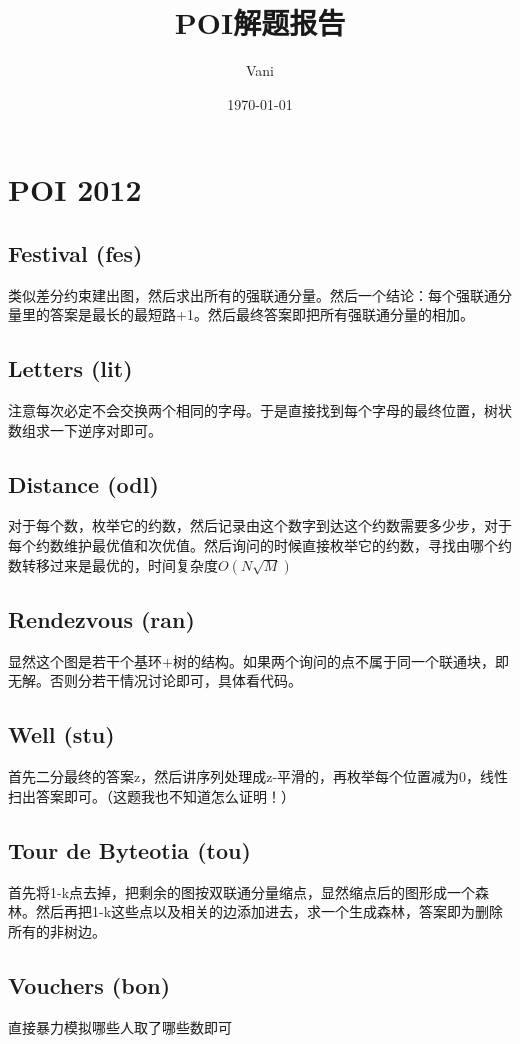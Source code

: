 \documentclass[a4paper,11pt]{article}
\title{POI解题报告}
\author{Vani}
\date{\today}
\begin{document}
\maketitle

\section{POI 2012}

\subsection*{Festival (fes)}
类似差分约束建出图，然后求出所有的强联通分量。然后一个结论：每个强联通分量里的答案是最长的最短路+1。然后最终答案即把所有强联通分量的相加。
\subsection*{Letters (lit)}
注意每次必定不会交换两个相同的字母。于是直接找到每个字母的最终位置，树状数组求一下逆序对即可。
\subsection*{Distance (odl)}
对于每个数，枚举它的约数，然后记录由这个数字到达这个约数需要多少步，对于每个约数维护最优值和次优值。然后询问的时候直接枚举它的约数，寻找由哪个约数转移过来是最优的，时间复杂度$O(N\sqrt{M})$
\subsection*{Rendezvous (ran)}
显然这个图是若干个基环+树的结构。如果两个询问的点不属于同一个联通块，即无解。否则分若干情况讨论即可，具体看代码。
\subsection*{Well (stu)}
首先二分最终的答案z，然后讲序列处理成z-平滑的，再枚举每个位置减为0，线性扫出答案即可。（这题我也不知道怎么证明！）
\subsection*{Tour de Byteotia (tou)}
首先将1-k点去掉，把剩余的图按双联通分量缩点，显然缩点后的图形成一个森林。然后再把1-k这些点以及相关的边添加进去，求一个生成森林，答案即为删除所有的非树边。
\subsection*{Vouchers (bon)}
直接暴力模拟哪些人取了哪些数即可
\end{document}
